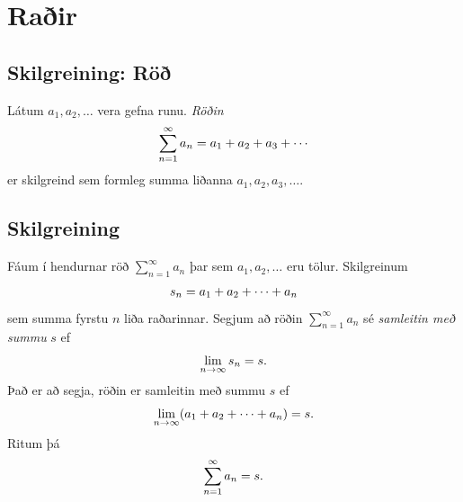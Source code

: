 \documentclass[b5paper,10pt,icelandic]{sphinxmanual}
\begin{document}

\section{Raðir}
\label{kafli09:rair}\label{kafli09:index-5}

\subsection{Skilgreining: Röð}
\label{kafli09:skilgreining-ro}
Látum \(a_1, a_2, \ldots\) vera gefna runu. \textit{Röðin}
\begin{gather}
\begin{split}\sum_{n=1}^\infty a_n  = a_1+a_2+a_3+\cdots\end{split}\notag
\end{gather}
er skilgreind sem formleg summa liðanna \(a_1, a_2, a_3, \ldots\).


\subsection{Skilgreining}
\label{kafli09:id6}\label{kafli09:index-6}
Fáum í hendurnar röð \(\sum_{n=1}^\infty a_n\) þar sem
\(a_1, a_2, \ldots\) eru tölur. Skilgreinum
\begin{gather}
\begin{split}s_n=a_1+a_2+\cdots+a_n\end{split}\notag
\end{gather}
sem summa fyrstu \(n\) liða raðarinnar. Segjum að röðin
\(\sum_{n=1}^\infty a_n\) sé \textit{samleitin með summu} \(s\) ef
\begin{gather}
\begin{split}\lim_{n\rightarrow\infty}s_n=s.\end{split}\notag
\end{gather}
Það er að segja, röðin er samleitin með summu \(s\) ef
\begin{gather}
\begin{split}\lim_{n\rightarrow \infty}(a_1+a_2+\cdots+a_n)=s.\end{split}\notag
\end{gather}
Ritum þá
\begin{gather}
\begin{split}\sum_{n=1}^\infty a_n=s.\end{split}\notag
\end{gather}
\end{document}
